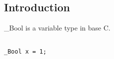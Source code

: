 
\subsection{Introduction}

\_Bool is a variable type in base C.

\begin{verbatim}

_Bool x = 1;

\end{verbatim}

